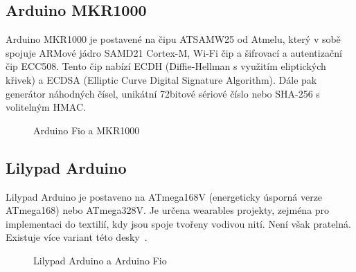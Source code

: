 	\subsection{Arduino MKR1000}
	Arduino MKR1000 je postavené na čipu ATSAMW25 od Atmelu, který v sobě spojuje ARMové jádro SAMD21 Cortex-M, Wi-Fi čip a šifrovací a autentizační čip ECC508. Tento čip nabízí ECDH (Diffie-Hellman s využitím eliptických křivek) a ECDSA (Elliptic Curve Digital Signature Algorithm). Dále pak generátor náhodných čísel, unikátní 72bitové sériové číslo nebo SHA-256 s volitelným HMAC.
	
	
	\begin{figure}[!ht]
    \centering
			\hspace*{5mm}
		\caption{Arduino Fio a MKR1000}
		\vspace{-30pt}	
\end{figure}
	
		\subsection{Lilypad Arduino} 
		Lilypad Arduino je postaveno na ATmega168V (energeticky úsporná verze ATmega168) nebo ATmega328V. Je určena wearables projekty, zejména pro implementaci do textilií, kdy jsou spoje tvořeny vodivou nití. Není však pratelná. Existuje více variant této desky~\cite{ArduinoLilipad}.	
	
	\begin{figure}[!ht]
    \centering
			\hspace*{5mm}
			\caption{Lilypad Arduino a Arduino Fio}
			\vspace{-10pt}	
\end{figure}
	

